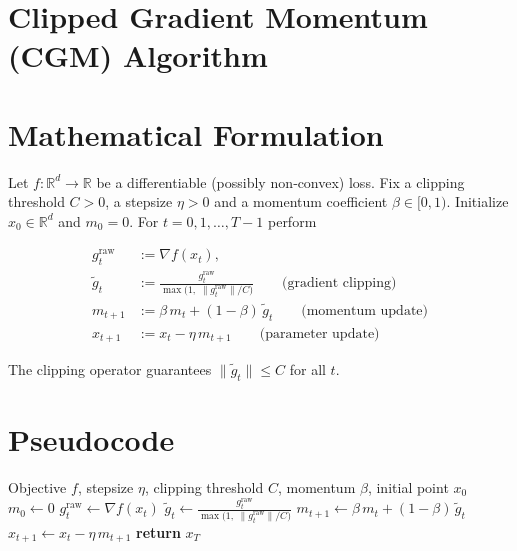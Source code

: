 \documentclass{article}
\newcommand{\R}{\mathbb{R}}
\begin{document}
\section*{Clipped Gradient Momentum (CGM) Algorithm}

\section*{Mathematical Formulation}
Let $f:\R^{d}\rightarrow\R$ be a differentiable (possibly non‑convex) loss.  
Fix a clipping threshold $C>0$, a stepsize $\eta>0$ and a momentum coefficient
$\beta\in[0,1)$.  Initialize $x_{0}\in\R^{d}$ and $m_{0}=0$.
For $t=0,1,\dots,T-1$ perform

\begin{align}
    g^{\text{raw}}_{t} &:= \nabla f(x_{t}) ,\\[4pt]
    \tilde g_{t} &:= \frac{g^{\text{raw}}_{t}}{\max\!\bigl(1,\; \|g^{\text{raw}}_{t}\|/C\bigr)}
    \qquad\text{(gradient clipping)}\label{eq:clip}\\[4pt]
    m_{t+1} &:= \beta\,m_{t}+(1-\beta)\,\tilde g_{t} \qquad\text{(momentum update)}\label{eq:momentum}\\[4pt]
    x_{t+1} &:= x_{t}-\eta\,m_{t+1}\qquad\text{(parameter update)}\label{eq:update}
\end{align}

The clipping operator guarantees $\|\tilde g_{t}\|\le C$ for all $t$.

\section*{Pseudocode}
\begin{algorithm}[H]
\caption{Clipped Gradient Momentum (CGM)}
\begin{algorithmic}[1]
\Require Objective $f$, stepsize $\eta$, clipping threshold $C$, momentum $\beta$, 
initial point $x_{0}$
\State $m_{0}\gets 0$
    \State $g^{\text{raw}}_{t}\gets \nabla f(x_{t})$
    \State $\displaystyle \tilde g_{t}\gets 
          \frac{g^{\text{raw}}_{t}}{\max\bigl(1,\;\|g^{\text{raw}}_{t}\|/C\bigr)}$
    \State $m_{t+1}\gets \beta\,m_{t}+(1-\beta)\,\tilde g_{t}$
    \State $x_{t+1}\gets x_{t}-\eta\,m_{t+1}$
\EndFor
\State \textbf{return} $x_{T}$
\end{algorithmic}
\end{algorithm}
\end{document}
